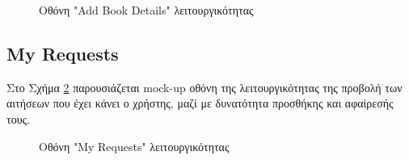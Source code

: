 \documentclass[12pt,a4paper]{article}
\begin{document}
\begin{figure}[H]
	\caption{Οθόνη "Add Book Details" λειτουργικότητας}
	\label{Οθόνη "Add Book Details" λειτουργικότητας}
\end{figure}


\subsection{My Requests}

Στο Σχήμα \ref{Οθόνη "My Requests" λειτουργικότητας} παρουσιάζεται mock-up οθόνη της λειτουργικότητας της προβολή των αιτήσεων που έχει κάνει ο χρήστης, μαζί με δυνατότητα προσθήκης και αφαίρεσής τους.

\begin{figure}[H]
	\caption{Οθόνη "My Requests" λειτουργικότητας}
	\label{Οθόνη "My Requests" λειτουργικότητας}
\end{figure}
\end{document}
